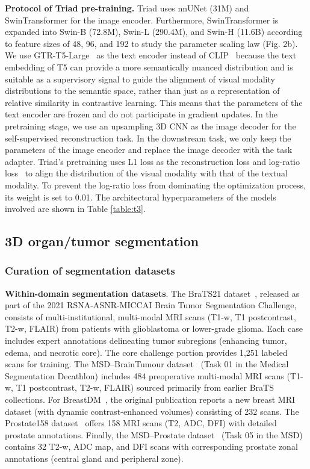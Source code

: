 \noindent \textbf{Protocol of Triad pre-training.} Triad uses nnUNet (31M)\cite{isensee2021nnu} and SwinTransformer\cite{hatamizadeh2021swin} for the image encoder. Furthermore, SwinTransformer is expanded into Swin-B (72.8M), Swin-L (290.4M), and Swin-H (11.6B) according to feature sizes of 48, 96, and 192 to study the parameter scaling law (Fig. 2b).
We use GTR-T5-Large~\cite{ni2021large} as the text encoder instead of CLIP~\cite{radford2021learning} because the text embedding of T5 can provide a more semantically nuanced distribution and is suitable as a supervisory signal to guide the alignment of visual modality distributions to the semantic space, rather than just as a representation of relative similarity in contrastive learning. This means that the parameters of the text encoder are frozen and do not participate in gradient updates.
In the pretraining stage, we use an upsampling 3D CNN as the image decoder for the self-supervised reconstruction task. In the downstream task, we only keep the parameters of the image encoder and replace the image decoder with the task adapter.
Triad's pretraining uses L1 loss as the reconstruction loss and log-ratio loss~\cite{kim2019deep} to align the distribution of the visual modality with that of the textual modality. To prevent the log-ratio loss from dominating the optimization process, its weight is set to 0.01.
The architectural hyperparameters of the models involved are shown in Table \ref{table:t3}.


\subsection{3D organ/tumor segmentation}
\label{sec:sts}

\subsubsection{Curation of segmentation datasets}

\textbf{Within-domain segmentation datasets}. The BraTS21 dataset~\citep{baid2021rsna}, released as part of the 2021 RSNA-ASNR-MICCAI Brain Tumor Segmentation Challenge, consists of multi-institutional, multi-modal MRI scans (T1-w, T1 postcontrast, T2-w, FLAIR) from patients with glioblastoma or lower-grade glioma. Each case includes expert annotations delineating tumor subregions (enhancing tumor, edema, and necrotic core). The core challenge portion provides 1,251 labeled scans for training.
The MSD–BrainTumour dataset~\citep{antonelli2022medical} (Task 01 in the Medical Segmentation Decathlon) includes 484 preoperative multi-modal MRI scans (T1-w, T1 postcontrast, T2-w, FLAIR) sourced primarily from earlier BraTS collections.
For BreastDM~\citep{zhao2023breastdm}, the original publication reports a new breast MRI dataset (with dynamic contrast-enhanced volumes) consisting of 232 scans.
The Prostate158 dataset~\citep{adams2022prostate158} offers 158 MRI scans (T2, ADC, DFI) with detailed prostate annotations.
Finally, the MSD–Prostate dataset~\citep{antonelli2022medical} (Task 05 in the MSD) contains 32 T2-w, ADC map, and DFI scans with corresponding prostate zonal annotations (central gland and peripheral zone).

